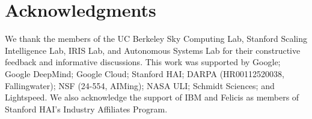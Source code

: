 \section{Acknowledgments}

We thank the members of the UC Berkeley Sky Computing Lab, Stanford Scaling Intelligence Lab, IRIS Lab, and Autonomous Systems Lab for their constructive feedback and informative discussions. This work was supported by Google; Google DeepMind; Google Cloud; Stanford HAI; DARPA (HR00112520038, Fallingwater); NSF (24-554, AIMing); NASA ULI; Schmidt Sciences; and Lightspeed. We also acknowledge the support of IBM and Felicis as members of Stanford HAI's Industry Affiliates Program.

